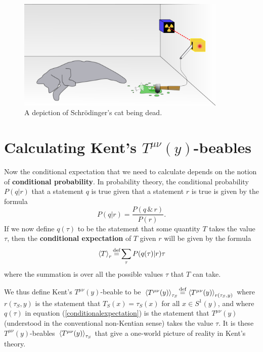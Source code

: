   \begin{figure}[ht!]
    \captionsetup{justification=justified}
    \centering
    \includegraphics[width=100mm]{Chapter03/Schrodingers_deadcat.png}
    \caption[Caption for LOF]{A depiction of Schr\"{o}dinger's cat being dead.\protect\footnotemark}
    \label{deadcat}
    \end{figure}

\section{Calculating Kent's $T^{\mu\nu}(y)$-beables \label{kentcalculation}}

Now the conditional expectation that we need to calculate depends on the notion of \textbf{conditional probability}. In probability theory, the conditional probability $P(q|r)$ that a statement $q$ is true given that a statement $r$ is true is given by the formula
\begin{equation} \label{conditionalprobability}
  P(q|r)=\frac{P(q\, \&\,  r)}{P(r)}. 
\end{equation}
If we now define $q(\tau)$ to be the statement that some quantity $T$  takes the value $\tau$, then the  \textbf{conditional expectation} of  $T$ given $r$ will be given by the formula
\begin{equation}\label{conditionalexpectation}
\ev*{T}_r\myeq\sum_\tau P(q(\tau)|r)\tau
\end{equation}
where the summation is over all the possible values $\tau$ that $T$ can take.

We thus define Kent's $T^{\mu\nu}(y)$-beable to be $\ev*{T^{\mu\nu}(y)}_{\tau_S}\myeq \ev*{T^{\mu\nu}(y)}_{r(\tau_S,y)}$\label{Kentbeable} where $r(\tau_S, y)$ is the statement that $T_S(x)=\tau_S(x)$ for all $x\in S^1(y)$, and where $q(\tau)$ in equation (\ref{conditionalexpectation}) is the statement that $T^{\mu\nu}(y)$ (understood in the conventional non-Kentian sense) takes the value $\tau$. It is these $T^{\mu\nu}(y)$-beables $\ev*{T^{\mu\nu}(y)}_{\tau_S}$ that give a one-world picture of reality in Kent's theory.

